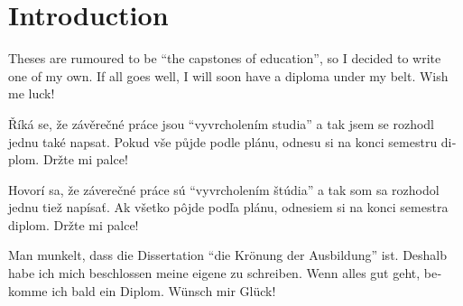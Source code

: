 \documentclass[
  digital,     %
  twoside,     %
  lof,         %
  lot,         %
]{fithesis4}
\begin{document}
\makeatletter
  \thesis@preamble %
\makeatother

\chapter*{Introduction}

Theses are rumoured to be \enquote{the capstones of education}, so
I decided to write one of my own. If all goes well, I will soon
have a diploma under my belt. Wish me luck!

\begin{otherlanguage}{czech}
Říká se, že závěrečné práce jsou \enquote{vyvrcholením studia}
a tak jsem se rozhodl jednu také napsat. Pokud vše půjde podle
plánu, odnesu si na konci semestru diplom. Držte mi palce!
\end{otherlanguage}

\begin{otherlanguage}{slovak}
Hovorí sa, že záverečné práce sú \enquote{vyvrcholením štúdia}
a tak som sa rozhodol jednu tiež napísať. Ak všetko pôjde podľa
plánu, odnesiem si na konci semestra diplom. Držte mi palce!
\end{otherlanguage}

\begin{otherlanguage}{german}
Man munkelt, dass die Dissertation \enquote{die Krönung der
Ausbildung} ist. Deshalb habe ich mich beschlossen meine eigene
zu schreiben. Wenn alles gut geht, bekomme ich bald ein Diplom.
Wünsch mir Glück!
\end{otherlanguage}
\end{document}
